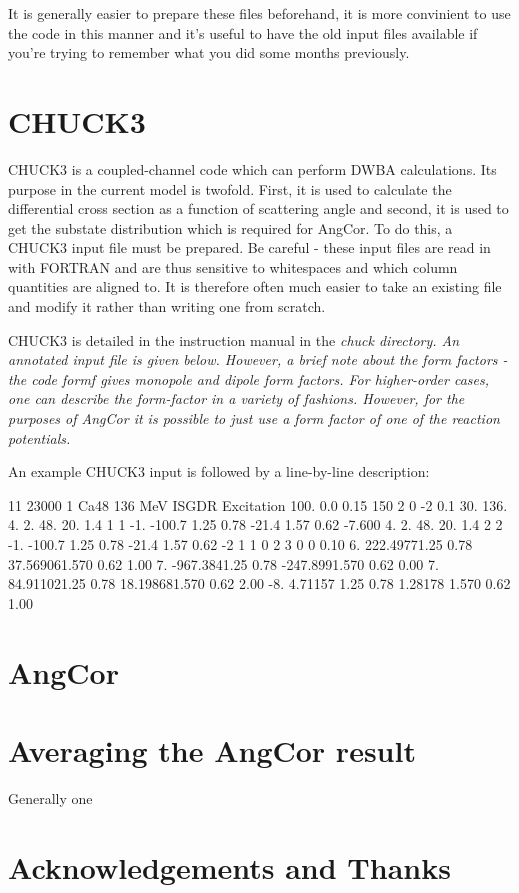 \documentclass[a4paper,10pt]{article}
\begin{document}
It is generally easier to prepare these files beforehand, it is more convinient to use the code in this manner and it's useful to have the old input files available if you're trying to remember what you did some months previously.


\section{CHUCK3}

CHUCK3 is a coupled-channel code which can perform DWBA calculations. Its purpose in the current model is twofold. First, it is used to calculate the differential cross section as a function of scattering angle and second, it is used to get the substate distribution which is required for AngCor. To do this, a CHUCK3 input file must be prepared. Be careful - these input files are read in with FORTRAN and are thus sensitive to whitespaces and which column quantities are aligned to. It is therefore often much easier to take an existing file and modify it rather than writing one from scratch.

CHUCK3 is detailed in the instruction manual in the \it{chuck} directory. An annotated input file is given below. However, a brief note about the form factors - the code \it{formf} gives monopole and dipole form factors. For higher-order cases, one can describe the form-factor in a variety of fashions. However, for the purposes of AngCor it is possible to just use a form factor of one of the reaction potentials.

An example CHUCK3 input is followed by a line-by-line description:

11     23000     1    Ca48  136 MeV      ISGDR Excitation
100.    0.0    0.15
150  2  0 -2
0.1     30.
136.    4.      2.      48.     20.     1.4
  1  1
-1.     -100.7  1.25    0.78            -21.4   1.57    0.62 
-7.600  4.      2.      48.     20.     1.4
  2  2
-1.     -100.7  1.25    0.78            -21.4   1.57    0.62 
 -2  1  1  0  2  3  0  0 0.10
6.      222.49771.25    0.78            37.569061.570   0.62            1.00
7.      -967.3841.25    0.78            -247.8991.570   0.62            0.00
7.      84.911021.25    0.78            18.198681.570   0.62            2.00
-8.     4.71157 1.25    0.78            1.28178 1.570   0.62            1.00



\section{AngCor}



\section{Averaging the AngCor result}

Generally one 

\section{Acknowledgements and Thanks}
\end{document}
